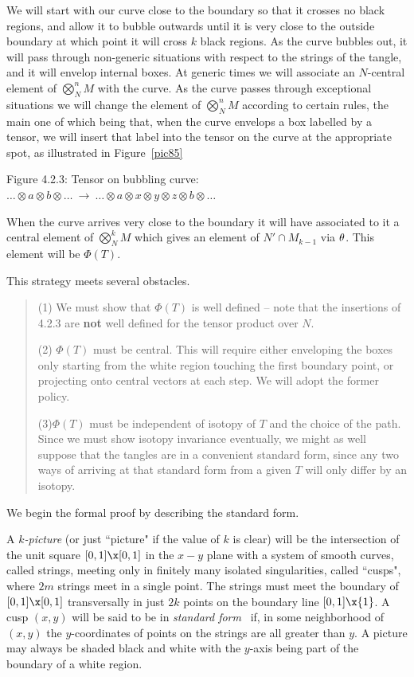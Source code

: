 We will start with our curve close to the boundary so that it
crosses no black regions, and allow it to bubble outwards until it
is very close to the outside boundary at which point it will cross
$k$ black regions. As the curve bubbles out, it will pass through
non-generic  situations with respect to the strings of the tangle,
and it will envelop internal boxes. At generic times we will
associate an $N$-central element of $\bigotimes^n_N M$ with the
curve. As the curve passes through exceptional situations we will
change the element of $\bigotimes^n_N M$ according to certain
rules, the main one of which being that, when the curve envelops a
box labelled by a tensor, we will insert that label into the
tensor on the curve at the appropriate spot, as illustrated in
Figure~\ref{pic85}
\[
        
\]
\begin{center}
Figure 4.2.3: Tensor on bubbling curve: $\dots\otimes           
a\otimes b\otimes\dots
\ \to \ \dots\otimes a\otimes x \otimes
y\otimes z \otimes b\otimes\dots$
\end{center}

\bs\ni When the curve arrives very close to the boundary it will
have associated to it a central element of $\bigotimes^k_N M$ which
gives an element of $N'\cap M_{k-1}$ via $\theta$. This element will
be $\Phi(T)$.

This strategy meets several obstacles.
\begin{verse}
(1) We must show that $\Phi(T)$ is well defined -- note that the
insertions of 4.2.3 are {\bf not} well defined for the tensor
product over $N$.

(2) $\Phi(T)$ must be central. This will require either
enveloping the boxes only starting from the white region touching
the first boundary point, or projecting onto central vectors at
each step. We will adopt the former policy.

(3)$\Phi(T)$ must be independent of isotopy of $T$ and the
choice of the path. Since we must show isotopy invariance
eventually, we might as well suppose that the tangles are in a
convenient standard form, since any two ways of arriving at that
standard form from a given $T$ will only differ by an isotopy.
\end{verse}

We begin the formal proof by describing the standard form.

\medskip A $k${\it -picture} (or just ``picture"
 if the value of $k$ is clear) will be the intersection of the unit
square $[0,1]\x [0,1]$ in the $x\!-\!y$ plane with a system of
smooth curves, called strings, meeting only in finitely many
isolated  singularities, called ``cusps", where $2m$ strings meet
in a single point. The strings must meet the boundary of $[0,1]\x
[0,1]$ transversally in just $2k$ points on the boundary line
$[0,1]\x
\{1\}$.  A cusp $(x,y)$ will be said to be in {\it standard form} \
if, in some neighborhood of $(x,y)$ the $y$-coordinates of points
on the strings are all greater than $y$. A picture may always be
shaded black and white with the $y$-axis being part of the boundary
of a white region.

